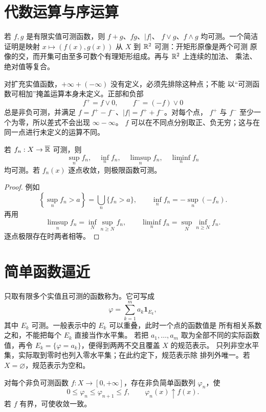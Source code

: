 \section{代数运算与序运算}

若 $f,g$ 是有限实值可测函数，则 $f+g$、$fg$、$|f|$、
$f\vee g$、$f\wedge g$ 均可测。一个简洁证明是映射
$x\mapsto(f(x),g(x))$ 从 $X$ 到 $\mathbb{R}^2$ 可测：开矩形原像是两个可测
原像的交，而开集可由至多可数个有理矩形组成。再与 $\mathbb{R}^2$ 上连续的加法、
乘法、绝对值等复合。

对扩充实值函数，$+\infty+(-\infty)$ 没有定义，必须先排除这种点；不能
以“可测函数可相加”掩盖运算本身未定义。正部和负部
\[
 f^+=f\vee0,\qquad f^-=(-f)\vee0
\]
总是非负可测，并满足 $f=f^+-f^-$、$|f|=f^++f^-$。对每个点，
$f^+$ 与 $f^-$ 至少一个为零，所以差式不会出现 $\infty-\infty$。
$f$ 可以在不同点分别取正、负无穷；这与在同一点进行未定义的运算不同。

\begin{theorem}[可数序运算]
\label{thm:measurable-countable-order-operations}
若 $f_n:X\to\overline{\mathbb{R}}$ 可测，则
\[
 \sup_nf_n,\quad \inf_nf_n,\quad
 \limsup_nf_n,\quad\liminf_nf_n
\]
均可测。若 $f_n(x)$ 逐点收敛，则极限函数可测。
\end{theorem}

\begin{proof}
例如
\[
 \left\{\sup_nf_n>a\right\}=\bigcup_n\{f_n>a\},
 \qquad
 \inf_nf_n=-\sup_n(-f_n).
\]
再用
\[
 \limsup_nf_n=\inf_N\sup_{n\ge N}f_n,
 \qquad
 \liminf_nf_n=\sup_N\inf_{n\ge N}f_n.
\]
逐点极限存在时两者相等。
\end{proof}

\section{简单函数逼近}

\begin{definition}
只取有限多个实值且可测的函数称为。它可写成
\[
 \varphi=\sum_{k=1}^ma_k\mathbf1_{E_k},
\]
其中 $E_k$ 可测。一般表示中的 $E_k$ 可以重叠，此时一个点的函数值是
所有相关系数之和，不能把每个 $E_k$ 直接当作水平集。
若把 $a_1,\ldots,a_m$ 取为全部不同的实际函数值，再令
$E_k=\{\varphi=a_k\}$，便得到两两不交且覆盖 $X$ 的规范表示。
只列非空水平集，实际取到零时也列入零水平集；在此约定下，规范表示除
排列外唯一。若 $X=\varnothing$，规范表示为空和。
\end{definition}

\begin{theorem}[非负简单函数逼近]
\label{thm:measurable-simple-approximation}
对每个非负可测函数 $f:X\to[0,+\infty]$，存在非负简单函数列
$\varphi_n$，使
\[
 0\le\varphi_n\le\varphi_{n+1}\le f,
 \qquad \varphi_n(x)\uparrow f(x).
\]
若 $f$ 有界，可使收敛一致。
\end{theorem}


